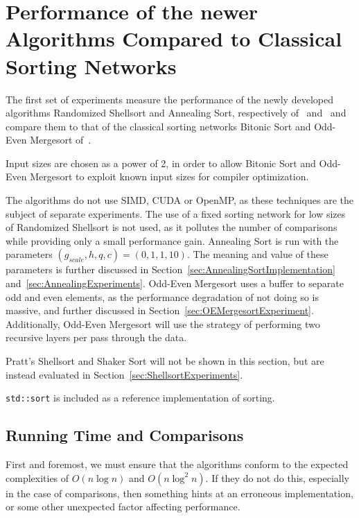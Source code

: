\FloatBarrier
\section{Performance of the newer Algorithms Compared to Classical Sorting Networks} 
\label{sec:Performance}

The first set of experiments measure the performance of the newly developed algorithms Randomized Shellsort and Annealing Sort, respectively of~ and~ and compare them to that of the classical sorting networks Bitonic Sort and Odd-Even Mergesort of~.

Input sizes are chosen as a power of 2, in order to allow Bitonic Sort and Odd-Even Mergesort to exploit known input sizes for compiler optimization.

The algorithms do not use SIMD, CUDA or OpenMP, as these techniques are the subject of separate experiments.
The use of a fixed sorting network for low sizes of Randomized Shellsort is not used, as it pollutes the number of comparisons while providing only a small performance gain.
Annealing Sort is run with the parameters $(g_{scale}, h, q, c) = (0, 1, 1, 10)$. The meaning and value of these parameters is further discussed in Section~\ref{sec:AnnealingSortImplementation} and~\ref{sec:AnnealingExperiments}.
Odd-Even Mergesort uses a buffer to separate odd and even elements, as the performance degradation of not doing so is massive, and further discussed in Section~\ref{sec:OEMergesortExperiment}. Additionally, Odd-Even Mergesort will use the strategy of performing two recursive layers per pass through the data. 

Pratt's Shellsort and Shaker Sort will not be shown in this section, but are instead evaluated in Section~\ref{sec:ShellsortExperiments}.

\texttt{std::sort} is included as a reference implementation of sorting.

\subsection{Running Time and Comparisons}

First and foremost, we must ensure that the algorithms conform to the expected complexities of $O(n \log n)$ and $O(n \log^2 n)$. If they do not do this, especially in the case of comparisons, then something hints at an erroneous implementation, or some other unexpected factor affecting performance.

